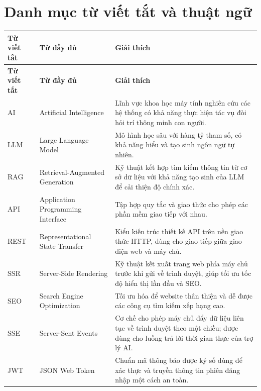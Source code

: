 \chapter*{Danh mục từ viết tắt và thuật ngữ}
\label{Appendix1}

\begin{longtable}{|L{0.18\textwidth}|L{0.27\textwidth}|L{0.49\textwidth}|}
\hline
\textbf{Từ viết tắt} & \textbf{Từ đầy đủ} & \textbf{Giải thích} \\
\hline
\endfirsthead

\hline
\textbf{Từ viết tắt} & \textbf{Từ đầy đủ} & \textbf{Giải thích} \\
\hline
\endhead

\hline
\endfoot

AI & Artificial Intelligence & Lĩnh vực khoa học máy tính nghiên cứu các hệ thống có khả năng thực hiện tác vụ đòi hỏi trí thông minh con người. \\
\hline

LLM & Large Language Model & Mô hình học sâu với hàng tỷ tham số, có khả năng hiểu và tạo sinh ngôn ngữ tự nhiên. \\
\hline

RAG & Retrieval-Augmented Generation & Kỹ thuật kết hợp tìm kiếm thông tin từ cơ sở dữ liệu với khả năng tạo sinh của LLM để cải thiện độ chính xác. \\
\hline

API & Application Programming Interface & Tập hợp quy tắc và giao thức cho phép các phần mềm giao tiếp với nhau. \\
\hline

REST & Representational State Transfer & Kiểu kiến trúc thiết kế API trên nền giao thức HTTP, dùng cho giao tiếp giữa giao diện web và máy chủ. \\
\hline

SSR & Server-Side Rendering & Kỹ thuật kết xuất trang web phía máy chủ trước khi gửi về trình duyệt, giúp tối ưu tốc độ hiển thị lần đầu và SEO. \\
\hline

SEO & Search Engine Optimization & Tối ưu hóa để website thân thiện và dễ được các công cụ tìm kiếm xếp hạng cao. \\
\hline

SSE & Server-Sent Events & Cơ chế cho phép máy chủ đẩy dữ liệu liên tục về trình duyệt theo một chiều; được dùng cho luồng trả lời thời gian thực của trợ lý AI. \\
\hline

JWT & JSON Web Token & Chuẩn mã thông báo được ký số dùng để xác thực và truyền thông tin phiên đăng nhập một cách an toàn. \\
\hline


\end{longtable}
